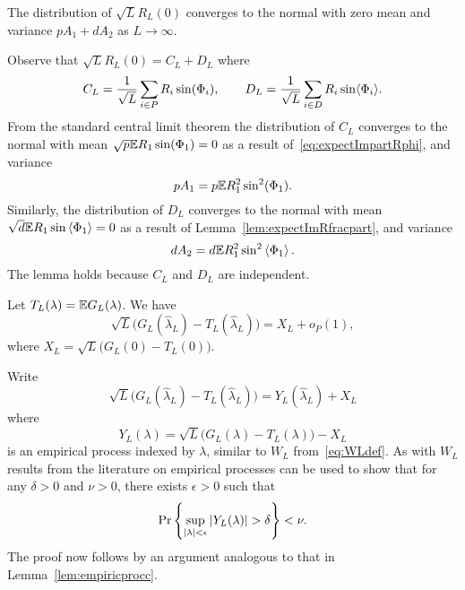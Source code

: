 \documentclass[journal]{IEEEtran}
\begin{document}
\begin{lemma}\label{lem:convdistGLdash}
The distribution of $\sqrt{L}R_L(0)$ converges to the normal with zero mean and variance $pA_1 + dA_2$ as $L\rightarrow\infty$.
\end{lemma}
\begin{IEEEproof}
Observe that $\sqrt{L} R_L(0) = C_L + D_L$ where
\[
C_L = \frac{1}{\sqrt{L}} \sum_{i \in P} R_i \sin(\Phi_i), \qquad D_L = \frac{1}{\sqrt{L}} \sum_{i \in D} R_i \sin\langle \Phi_i \rangle.
\]
From the standard central limit theorem the distribution of $C_L$ converges to the normal with mean $\sqrt{p}{\mathbb E} R_1 \sin(\Phi_1) = 0$ as a result of~\eqref{eq:expectImpartRphi}, and variance
\[
p A_1 = p {\mathbb E} R_1^2 \sin^2(\Phi_1).
\]
Similarly, the distribution of $D_L$ converges to the normal with mean $\sqrt{d}{\mathbb E} R_1 \sin\left\langle \Phi_1 \right\rangle = 0$ as a result of Lemma~\ref{lem:expectImRfracpart}, and variance
\[
d A_2 = d {\mathbb E} R_1^2 \sin^2\left\langle \Phi_1 \right\rangle.
\]
The lemma holds because $C_L$ and $D_L$ are independent. 
\end{IEEEproof}

\begin{lemma}\label{lem:empiricprocforrho} Let $T_L(\lambda) = {\mathbb E} G_L(\lambda)$.  We have
\[
\sqrt{L}\big( G_L(\hat{\lambda}_L) - T_L(\hat{\lambda}_L) \big) =  X_L + o_P(1),
\]
where $X_L = \sqrt{L} \big( G_L(0) - T_L(0) \big)$.
\end{lemma}
\begin{IEEEproof}
Write
\[
\sqrt{L}\big( G_L(\hat{\lambda}_L) - T_L(\hat{\lambda}_L) \big) = Y_L(\hat{\lambda}_L) + X_L
\]
where
\begin{equation}\label{eq:YLdef}
Y_L(\lambda) = \sqrt{L}\big( G_L(\lambda) - T_L(\lambda) \big) - X_L
\end{equation}
is an empirical process indexed by $\lambda$, similar to $W_L$ from~\eqref{eq:WLdef}.  As with $W_L$ results from the literature on empirical processes can be used to show that  
for any $\delta > 0$ and $\nu > 0$, there exists $\epsilon > 0$ such that
\[
\Pr\left\{ \sup_{{\vert \lambda \vert}<\epsilon}{\vert Y_L(\lambda) \vert} > \delta  \right\} < \nu.
\]
The proof now follows by an argument analogous to that in Lemma~\ref{lem:empiricprocc}.
\end{IEEEproof}
\end{document}
